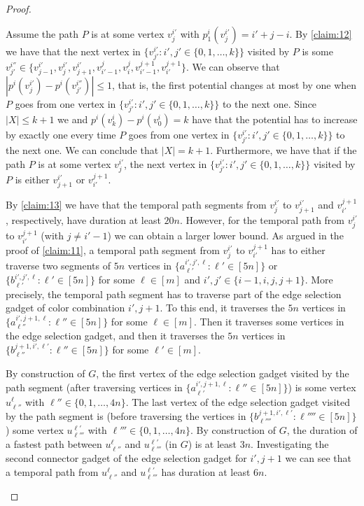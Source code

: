 \documentclass[a4paper,UKenglish,cleveref, autoref, thm-restate, anonymous]{lipics-v2021}
\begin{document}
\begin{proof}
\begin{claimproof}
    Assume the path $P$ is at some vertex $v^{i'}_j$ with $p^i_1(v^{i'}_j)=i'+j-i$.
    By \cref{claim:12} we have that the next vertex in  $\{v^{i'}_{j'} :  i',j'\in \{0,1,\ldots,k\}\}$ visited by $P$ is some $v^{i''}_{j'}\in \{v^{i'}_{j-1},v^{i'}_j,v^{i'}_{j+1},v^j_{i'-1},v^j_i,v^{j+1}_{i'-1},v^{j+1}_{i'}\}$. We can observe that $|p^i(v^{i'}_j)-p^i(v^{i''}_{j'})|\le 1$, that is, the first potential changes at most by one when $P$ goes from one vertex in $\{v^{i'}_{j'} :  i',j'\in \{0,1,\ldots,k\}\}$ to the next one.
    Since $|X|\le k+1$ we and $p^i(v^i_k)-p^i(v^i_0)=k$ have that the  potential has to increase by exactly one every time $P$ goes from one vertex in $\{v^{i'}_{j'} :  i',j'\in \{0,1,\ldots,k\}\}$ to the next one. 
    We can conclude that $|X|=k+1$.
    Furthermore, we have that if the path $P$ is at some vertex $v^{i'}_j$, the next vertex in $\{v^{i'}_{j'} :  i',j'\in \{0,1,\ldots,k\}\}$ visited by $P$ is either $v^{i'}_{j+1}$ or $v^{j+1}_{i'}$.

    By \cref{claim:13} we have that the temporal path segments from $v^{i'}_j$ to $v^{i'}_{j+1}$ and $v^{j+1}_{i'}$, respectively, have duration at least $20n$. However, for the temporal path from $v^{i'}_j$ to $v^{j+1}_{i'}$ (with $j\neq i'-1$) we can obtain a larger lower bound.
As argued in the proof of \cref{claim:11}, a temporal path segment from $v^{i'}_j$ to $v^{j+1}_{i'}$ has to either traverse two segments of $5n$ vertices in $\{a^{i',j',\ell}_{\ell'} :  \ell'\in[5n]\}$ or $\{b^{i',j',\ell}_{\ell'} :  \ell'\in[5n]\}$ for some $\ell\in[m]$ and $i',j'\in\{i-1,i,j,j+1\}$. 
More precisely, the temporal path segment has to traverse part of the edge selection gadget of color combination $i',j+1$. To this end, it traverses the $5n$ vertices in $\{a^{i',j+1,\ell}_{\ell''} :  \ell''\in[5n]\}$ for some $\ell\in[m]$. Then it traverses some vertices in the edge selection gadget, and then it traverses the $5n$ vertices in $\{b^{j+1,i',\ell'}_{\ell''} :  \ell''\in[5n]\}$ for some $\ell'\in[m]$.

By construction of $G$, the first vertex of the edge selection gadget visited by the path segment (after traversing vertices in $\{a^{i',j+1,\ell}_{\ell'} :  \ell''\in[5n]\}$) is some vertex $u^\ell_{\ell''}$ with $\ell''\in\{0,1,\ldots,4n\}$.
The last vertex of the edge selection gadget visited by the path segment is (before traversing the vertices in $\{b^{j+1,i',\ell'}_{\ell''''} :  \ell''''\in[5n]\}$) some vertex $u^{\ell'}_{\ell'''}$ with $\ell'''\in\{0,1,\ldots,4n\}$. By construction of $G$, the duration of a fastest path between $u^\ell_{\ell''}$ and $u^{\ell'}_{\ell'''}$ (in $G$) is at least $3n$.
Investigating the second connector gadget of the edge selection gadget for $i',j+1$ we can see that a temporal path from $u^\ell_{\ell''}$ and $u^{\ell'}_{\ell'''}$ has duration at least $6n$.


\end{claimproof}
\end{proof}
\end{document}

